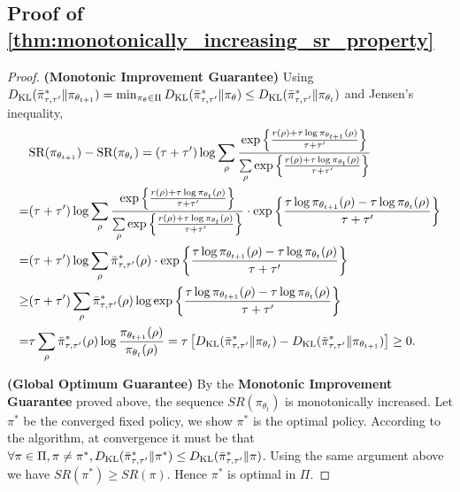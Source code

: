 \subsection{Proof of \cref{thm:monotonically_increasing_sr_property}}
\begin{proof}
	{\bf (Monotonic Improvement Guarantee)} Using $D_{\mathrm{KL}}(\bar{\pi}_{\tau,\tau^{\prime}}^* \| \pi_{\theta_{t+1}}) = \min_{\pi_\theta \in \Pi}{ D_{\mathrm{KL}}(\bar{\pi}_{\tau,\tau^{\prime}}^* \| \pi_\theta)} \le D_{\mathrm{KL}}(\bar{\pi}_{\tau,\tau^{\prime}}^* \| \pi_{\theta_t})$ and Jensen's inequality,
	\begin{equation*}
	\begin{split}
	&\text{SR}(\pi_{\theta_{t+1}}) - \text{SR}(\pi_{\theta_t}) = (\tau + \tau^{\prime}) \log{ \sum\limits_{\rho}{ \frac{  \exp\left\{ \frac{r(\rho) + \tau \log{\pi_{\theta_{t+1}}(\rho)} }{\tau + \tau^{\prime}} \right\}  }{ \sum\limits_{\rho}{  \exp\left\{ \frac{r(\rho) + \tau \log{\pi_{\theta_t}(\rho)} }{\tau + \tau^{\prime}} \right\} } }  } } \\
	=& (\tau + \tau^{\prime}) \log{ \sum\limits_{\rho}{ \frac{  \exp\left\{ \frac{r(\rho) + \tau \log{\pi_{\theta_t}(\rho)} }{\tau + \tau^{\prime}} \right\}  }{ \sum\limits_{\rho}{  \exp\left\{ \frac{r(\rho) + \tau \log{\pi_{\theta_t}(\rho)} }{\tau + \tau^{\prime}} \right\} } }  } \cdot \exp\left\{ \frac{\tau \log{\pi_{\theta_{t+1}}(\rho)} - \tau \log{\pi_{\theta_t}(\rho)} }{\tau + \tau^{\prime}} \right\} } \\
	=& (\tau + \tau^{\prime}) \log{ \sum\limits_{\rho}{ \bar{\pi}_{\tau,\tau^{\prime}}^*(\rho) } \cdot \exp\left\{ \frac{\tau \log{\pi_{\theta_{t+1}}(\rho)} - \tau \log{\pi_{\theta_t}(\rho)} }{\tau + \tau^{\prime}} \right\} } \\
	\ge& (\tau + \tau^{\prime}) \sum\limits_{\rho}{ \bar{\pi}_{\tau,\tau^{\prime}}^*(\rho) \log{ \exp\left\{ \frac{\tau \log{\pi_{\theta_{t+1}}(\rho)} - \tau \log{\pi_{\theta_t}(\rho)} }{\tau + \tau^{\prime}} \right\} } } \\
	=& \tau \sum\limits_{\rho}{ \bar{\pi}_{\tau,\tau^{\prime}}^*(\rho) \log{ \frac{\pi_{\theta_{t+1}}(\rho)}{\pi_{\theta_t}(\rho)} } } = \tau \left[ D_{\mathrm{KL}}(\bar{\pi}_{\tau,\tau^{\prime}}^* \| \pi_{\theta_t}) - D_{\mathrm{KL}}(\bar{\pi}_{\tau,\tau^{\prime}}^* \| \pi_{\theta_{t+1}})\right] \ge 0.
	\end{split}
	\end{equation*}
	
	{\bf (Global Optimum Guarantee)} By the {\bf Monotonic Improvement Guarantee} proved above, the sequence $SR(\pi_{\theta_t})$ is monotonically increased. Let $\pi^*$ be the converged fixed policy, we show $\pi^*$ is the optimal policy. According to the algorithm, at convergence it must be that $\forall \pi\in \Pi, \pi\neq \pi^*, { D_{\mathrm{KL}}(\bar{\pi}_{\tau,\tau^{\prime}}^* \| \pi^*)} \le D_{\mathrm{KL}}(\bar{\pi}_{\tau,\tau^{\prime}}^* \| \pi)$. Using the same argument above we have $SR(\pi^*)\geq SR(\pi)$. Hence $\pi^*$ is optimal in $\Pi$. 
	

\end{proof}
